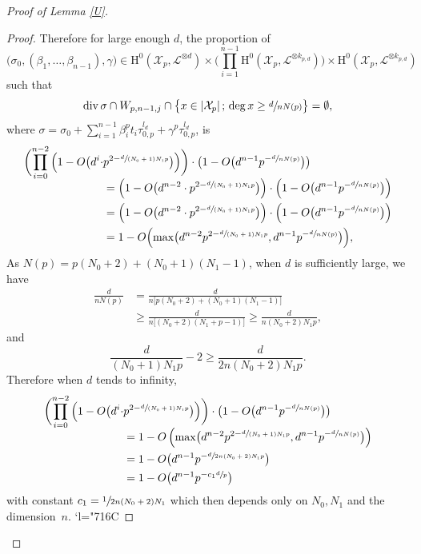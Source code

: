 \documentclass[11pt]{article}
\numberwithin{equation}{section}
\newcommand{\Changelback}{\mathcode`l="716C}
\newcommand{\sep}{\,;\,}
\theoremstyle{plain}
\theoremstyle{definition}
\newcommand{\ho}{\mathrm{H}}
\newcommand{\X}{\mathcal{X}}
\begin{document}
\begin{proof}[Proof of Lemma \ref{U}]
\begin{proof}[Proof]
Therefore for large enough $d$, the proportion of
\[
\big(\sigma_0, (\beta_1,\dots, \beta_{n-1}), \gamma\big)\in \ho^0(\X_p,\mathcal{L}^{\otimes d})\times \biggl(\prod_{i=1}^{n-1} \ho^0(\X_p,\mathcal{L}^{\otimes k_{p,d}}) \biggr) \times \ho^0(\X_p, \mathcal{L}^{\otimes k_{p,d}})
\]
such that
\[
\div \sigma\cap W_{p,n-1,j}\cap \bigl\{ x\in |\X_p|\sep \deg x\geq\sfrac{d}{nN(p)} \bigr\}=\emptyset,
\]
where $\sigma=\sigma_0+\sum_{i=1}^{n-1} \beta_i^pt_i\tau_{0,p}^{l_d}+\gamma^p\tau_{0,p}^{l_d}$, is
\begin{align*}
\biggl(\prod_{i=0}^{n-2}\Big(1-O\big(d^i\cdot &p^{2-\sfrac{d}{(N_0+1)N_1p}}\big) \Big) \biggr) \cdot \bigl(1-O\big(d^{n-1}p^{-\sfrac{d}{nN(p)}}\big) \bigr) \\[-5pt]
&=\left(1-O\big(d^{n-2}\cdot p^{2-\sfrac{d}{(N_0+1)N_1p}} \big)\right)\cdot \left(1-O\big(d^{n-1}p^{-\sfrac{d}{nN(p)}}\big) \right) \\
&=\left(1-O\big(d^{n-2}\cdot p^{2-\sfrac{d}{(N_0+1)N_1p}} \big)\right)\cdot \left(1-O\big(d^{n-1}p^{-\sfrac{d}{nN(p)}}\big) \right) \\
&=1-O\Bigl(\max\bigl(d^{n-2}p^{2-\sfrac{d}{(N_0+1)N_1p}}, d^{n-1}p^{-\sfrac{d}{nN(p)}}\bigr) \Bigr),
\end{align*}
As $N(p)=p(N_0+2)+(N_0+1)(N_1-1)$, when $d$ is sufficiently large, we have
\begin{align*}
\frac{d}{nN(p)}&= \frac{d}{n\big[p(N_0+2)+(N_0+1)(N_1-1)\big]}\\
&\geq \frac{d}{n\big[(N_0+2)(N_1+p-1)\big]}\geq \frac{d}{n(N_0+2)N_1 p},
\end{align*}
and
\[
\frac{d}{(N_0+1)N_1p}-2\geq \frac{d}{2n(N_0+2)N_1 p}.
\]
Therefore when $d$ tends to infinity,
\begin{align*}
\biggl(\prod_{i=0}^{n-2}\Big(1-O\big(d^i\cdot& p^{2-\sfrac{d}{(N_0+1)N_1p}}\big) \Big) \biggr) \cdot \bigl(1-O\big(d^{n-1}p^{-\sfrac{d}{nN(p)}}\big) \bigr) \\[-5pt]
&=1-O\left(\max\bigl(d^{n-2}p^{2-\sfrac{d}{(N_0+1)N_1p}}, d^{n-1}p^{-\sfrac{d}{nN(p)}}\bigr) \right)\\
&=1-O\bigl(d^{n-1}p^{-\sfrac{d}{2n(N_0+2)N_1 p}} \bigr)\\
&=1-O\bigl(d^{n-1}p^{-c_1\sfrac{d}{p}} \bigr)
\end{align*}
with constant $c_1=\sfrac{1}{2n(N_0+2)N_1 }$ which then depends only on $N_0,N_1$ and the dimension~$n$.
\Changelback
\end{proof}


\end{proof}
\end{document}
